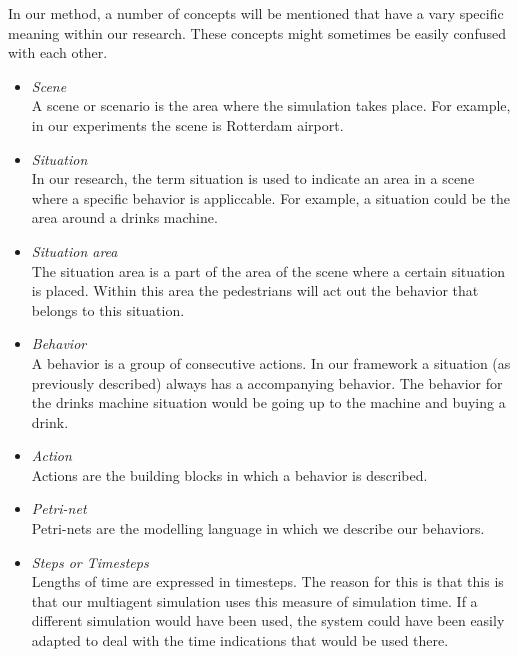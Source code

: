 \documentclass[11pt, a4paper]{book}
\begin{document}
In our method, a number of concepts will be mentioned that have a vary specific meaning within our research. These concepts might sometimes be easily confused with each other.
\begin{itemize}
\item \emph{Scene}\\
A scene or scenario is the area where the simulation takes place. For example, in our experiments the scene is Rotterdam airport.
\item \emph{Situation}\\
In our research, the term situation is used to indicate an area in a scene where a specific behavior is appliccable. For example, a situation could be the area around a drinks machine.
\item \emph{Situation area}\\
The situation area is a part of the area of the scene where a certain situation is placed. Within this area the pedestrians will act out the behavior that belongs to this situation.
\item \emph{Behavior}\\
A behavior is a group of consecutive actions. In our framework a situation (as previously described) always has a accompanying behavior. The behavior for the drinks machine situation would be going up to the machine and buying a drink.
\item \emph{Action}\\
Actions are the building blocks in which a behavior is described.
\item \emph{Petri-net}\\
Petri-nets are the modelling language in which we describe our behaviors.
\item \emph{Steps or Timesteps}\\
Lengths of time are expressed in timesteps. The reason for this is that this is that our multiagent simulation uses this measure of simulation time. If a different simulation would have been used, the system could have been easily adapted to deal with the time indications that would be used there.

\end{itemize}
\end{document}

